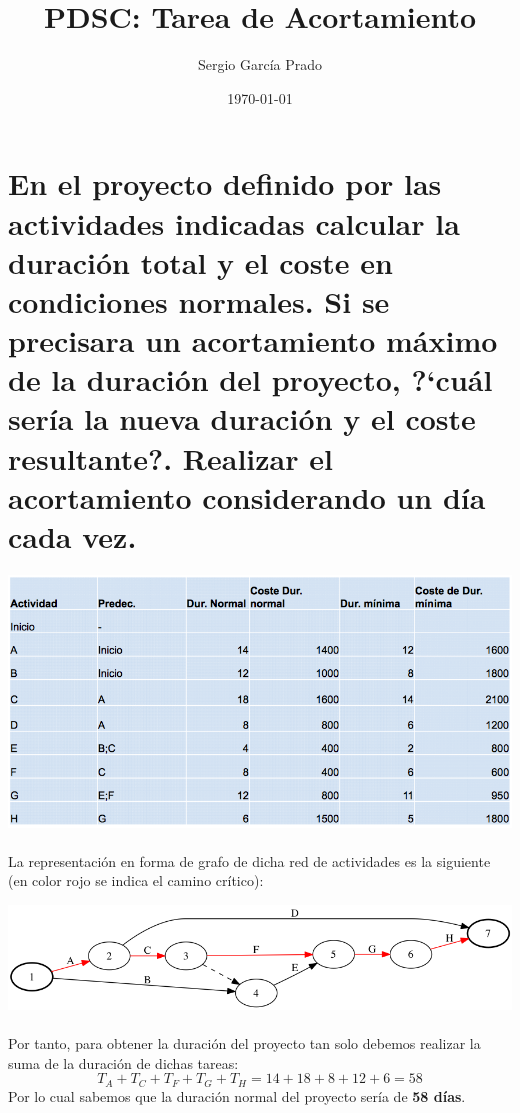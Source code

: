 \documentclass[10pt, a4paper,spanish]{article}
\title{\vspace{-15mm}\fontsize{24pt}{10pt}\selectfont\textbf{PDSC: Tarea de Acortamiento}} %
\author{Sergio García Prado}
\date{\today}
\begin{document}
	\maketitle %

	\thispagestyle{fancy} %



	\section{En el proyecto definido por las actividades indicadas calcular la duración total y el coste en condiciones normales. Si se precisara un acortamiento máximo de la duración del proyecto, ?`cuál sería la nueva duración y el coste resultante?. Realizar el acortamiento considerando un día cada vez.}

	\includegraphics[width=\textwidth]{exercise-title}


	\paragraph{}
	La representación en forma de grafo de dicha red de actividades es la siguiente (en color rojo se indica el camino crítico):

	\includegraphics[width=\textwidth]{graph-2}

	\paragraph{}
	Por tanto, para obtener la duración del proyecto tan solo debemos realizar la suma de la duración de dichas tareas:
	\[
	T_A + T_C + T_F + T_G + T_H = 14 + 18 + 8 + 12 + 6 = 58
	\]
	Por lo cual sabemos que la duración normal del proyecto sería de \textbf{58 días}.
\end{document}
